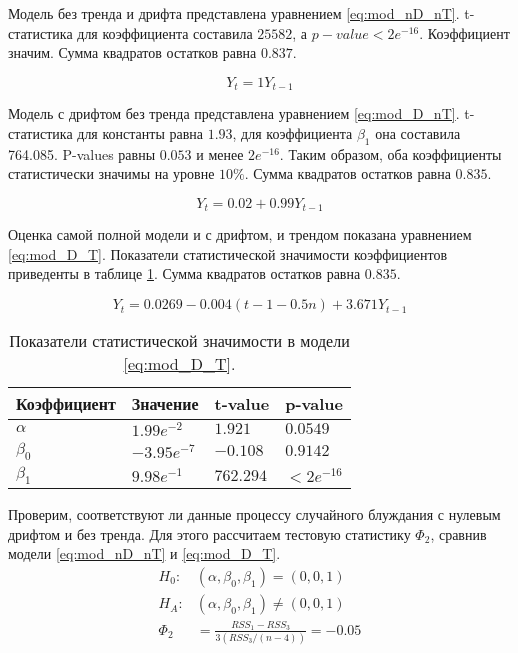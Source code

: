 \documentclass[a4paper,12pt]{article}
\begin{document}
Модель без тренда и дрифта представлена уравнением \ref{eq:mod_nD_nT}. t-статистика для коэффициента составила $25582$, а $p-value<2e^{-16}$. Коэффициент значим. Сумма квадратов остатков равна $0.837$.

\begin{equation}
  \label{eq:mod_nD_nT}
  Y_t=1Y_{t-1}
\end{equation}

Модель с дрифтом без тренда представлена уравнением \ref{eq:mod_D_nT}. t-статистика для константы равна $1.93$, для коэффициента $\beta_1$ она составила 764.085. P-values равны $0.053$ и менее $2e^{-16}$. Таким образом, оба коэффициенты статистически значимы на уровне $10\%$. Сумма квадратов остатков равна $0.835$.

\begin{equation}
  \label{eq:mod_D_nT}
  Y_t=0.02+0.99Y_{t-1}
\end{equation}

Оценка самой полной модели и с дрифтом, и трендом показана уравнением \ref{eq:mod_D_T}. Показатели статистической значимости коэффициентов приведенты в таблице \ref{tab:mod_D_T_coeff}. Сумма квадратов остатков равна $0.835$.

\begin{equation}
  \label{eq:mod_D_T}
  Y_t=0.0269-0.004(t-1-0.5n)+3.671Y_{t-1}
\end{equation}

\begin{table}
\centering
\caption{Показатели статистической значимости в модели \ref{eq:mod_D_T}.}
\label{tab:mod_D_T_coeff}
\begin{tabular}{|l|l|l|l|}
\hline
Коэффициент & Значение      & t-value   & p-value     \\ \hline
$\alpha$    & $1.99e^{-2}$  & $1.921$   & $0.0549$    \\ \hline
$\beta_0$   & $-3.95e^{-7}$ & $-0.108$  & $0.9142$    \\ \hline
$\beta_1$   & $9.98e^{-1}$  & $762.294$ & $<2e^{-16}$ \\ \hline
\end{tabular}
\end{table}

Проверим, соответствуют ли данные процессу случайного блуждания с нулевым дрифтом и без тренда. Для этого рассчитаем тестовую статистику $\Phi_2$, сравнив модели \ref{eq:mod_nD_nT} и \ref{eq:mod_D_T}.
\begin{align}
  H_0:& (\alpha,\beta_0,\beta_1)=(0,0,1)\\
  H_A:& (\alpha,\beta_0,\beta_1)\neq(0,0,1)\\
  \Phi_2&=\frac{RSS_1-RSS_3}{3(RSS_3/(n-4))}=-0.05
\end{align}
\end{document}
